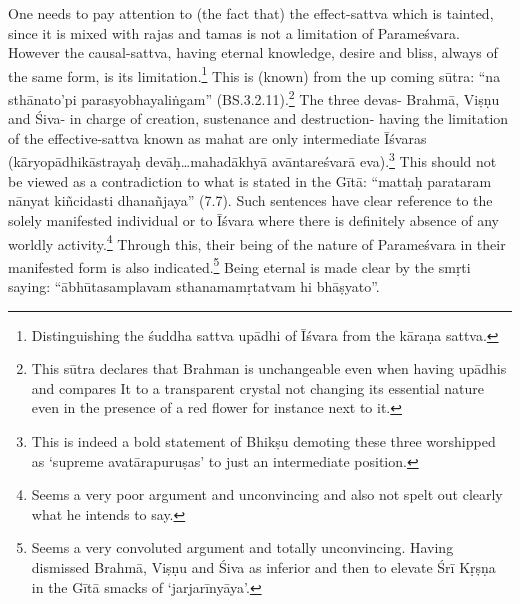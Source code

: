 One needs to pay attention to (the fact that) the effect-sattva which is tainted, since it is mixed with rajas and tamas is not a limitation of Parameśvara. However the causal-sattva, having eternal knowledge, desire and bliss, always of the same form, is its limitation.\footnote{Distinguishing the śuddha sattva upādhi of Īśvara from the kāraṇa sattva.} This is (known) from the up coming sūtra: “na sthānato’pi parasyobhayaliṅgam” (BS.3.2.11).\footnote{This sūtra declares that Brahman is unchangeable even when having upādhis and compares It to a transparent crystal not changing its essential nature even in the presence of a red flower for instance next to it.} The three devas- Brahmā, Viṣṇu and Śiva- in charge of creation, sustenance and destruction- having the limitation of the effective-sattva known as mahat are only intermediate Īśvaras (kāryopādhikāstrayaḥ devāḥ…mahadākhyā avāntareśvarā eva).\footnote{This is indeed a bold statement of Bhikṣu demoting these three worshipped as ‘supreme avatārapuruṣas’ to just an intermediate position.} This should not be viewed as a contradiction to what is stated in the Gītā: “mattaḥ parataram nānyat kiñcidasti dhanañjaya” (7.7). Such sentences have clear reference to the solely manifested individual or to Īśvara where there is definitely absence of any worldly activity.\footnote{Seems a very poor argument and unconvincing and also not spelt out clearly what he intends to say.} Through this, their being of the nature of Parameśvara in their manifested form is also indicated.\footnote{Seems a very convoluted argument and totally unconvincing. Having dismissed Brahmā, Viṣṇu and Śiva as inferior and then to elevate Śrī Kṛṣṇa in the Gītā smacks of ‘jarjarīnyāya’.} Being eternal is made clear by the smṛti saying: “ābhūtasamplavam sthanamamṛtatvam hi bhāṣyato”.  

